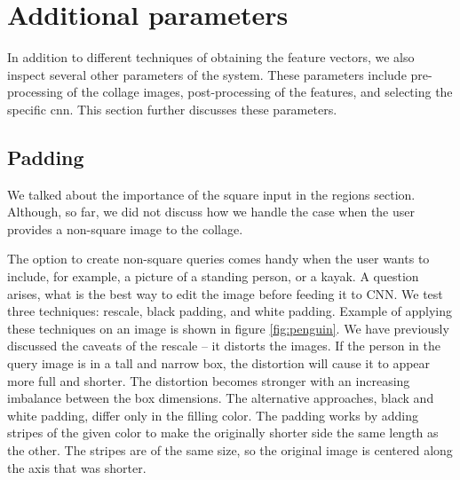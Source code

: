 \section{Additional parameters}

In addition to different techniques of obtaining the feature vectors, we also inspect several other parameters of the system. These parameters include pre-processing of the collage images, post-processing of the features, and selecting the specific \acrshort{cnn}. This section further discusses these parameters.

\subsection{Padding}

We talked about the importance of the square input in the regions section. Although, so far, we did not discuss how we handle the case when the user provides a non-square image to the collage.

The option to create non-square queries comes handy when the user wants to include, for example, a picture of a standing person, or a kayak. A question arises, what is the best way to edit the image before feeding it to CNN. We test three techniques: rescale, black padding, and white padding. Example of applying these techniques on an image is shown in figure \ref{fig:penguin}. We have previously discussed the caveats of the rescale -- it distorts the images. If the person in the query image is in a tall and narrow box, the distortion will cause it to appear more full and shorter. The distortion becomes stronger with an increasing imbalance between the box dimensions. The alternative approaches, black and white padding, differ only in the filling color. The padding works by adding stripes of the given color to make the originally shorter side the same length as the other. The stripes are of the same size, so the original image is centered along the axis that was shorter. 


